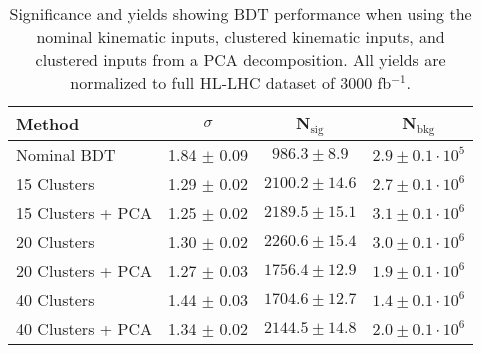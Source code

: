 \begin{table}[h!]
\label{tab:bdtPCACluster}
\begin{center}
    \begin{tabular}{|l|c|c|c|} %
      \hline\hline
      \textbf{Method} & $\sigma$ & N$_{\textrm{sig}}$ & N$_{\textrm{bkg}}$ \\
      \hline
      Nominal BDT & 1.84 $\pm$ 0.09       & $986.3\pm 8.9$   & $2.9\pm 0.1 \cdot 10^5$ \\
      15 Clusters & 1.29 $\pm$ 0.02       & $2100.2\pm 14.6$ & $2.7\pm 0.1 \cdot 10^6$ \\
      15 Clusters + PCA & 1.25 $\pm$ 0.02 & $2189.5\pm 15.1$ & $3.1\pm 0.1 \cdot 10^6$ \\         
      20 Clusters & 1.30 $\pm$ 0.02       & $2260.6\pm 15.4$ & $3.0\pm 0.1 \cdot 10^6$ \\
      20 Clusters + PCA & 1.27 $\pm$ 0.03 & $1756.4\pm 12.9$ & $1.9\pm 0.1 \cdot 10^6$ \\         
      40 Clusters & 1.44 $\pm$ 0.03       & $1704.6\pm 12.7$ & $1.4\pm 0.1 \cdot 10^6$ \\
      40 Clusters + PCA & 1.34 $\pm$ 0.02 & $2144.5\pm 14.8$ & $2.0\pm 0.1 \cdot 10^6$ \\         
      \hline\hline
    \end{tabular}
    \caption{Significance and yields showing BDT performance when using the nominal kinematic inputs, clustered kinematic inputs, and clustered inputs from a PCA decomposition. All yields are normalized to full HL-LHC dataset of 3000 fb$^{-1}$.}
    \end{center}
\end{table}
